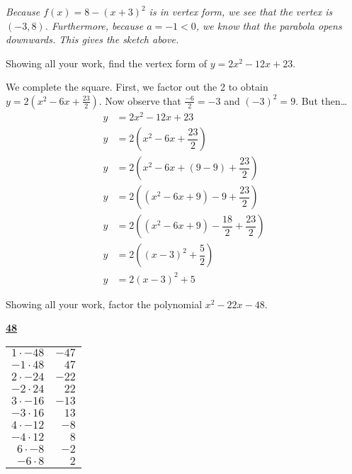 \documentclass[12pt,letterpaper]{exam}
\begin{document}
\begin{questions}
{\itshape Because $f(x)= 8 - (x + 3)^2$ is in vertex form, we see that the vertex is $(-3, 8)$. Furthermore, because $a= -1 < 0$, we know that the parabola opens downwards. This gives the sketch above.}



\newpage



\newpage
\question[6] Showing all your work, find the vertex form of $y= 2x^2 - 12x + 23$. \pspace

{\itshape 

We complete the square. First, we factor out the 2 to obtain $y= 2(x^2 - 6x + \frac{23}{2})$. Now observe that $\frac{-6}{2}= -3$ and $(-3)^2= 9$. But then\dots \pspace
	\[
	\begin{aligned}
	y&= 2x^2 - 12x + 23 \\[0.3cm]
	y&= 2 \left( x^2 - 6x + \dfrac{23}{2} \right) \\[0.3cm]
	y&= 2 \left( x^2 - 6x + (9 - 9) + \dfrac{23}{2} \right) \\[0.3cm]
	y&= 2 \left( (x^2 - 6x + 9) - 9 + \dfrac{23}{2} \right) \\[0.3cm]
	y&= 2 \left( (x^2 - 6x + 9) - \dfrac{18}{2} + \dfrac{23}{2} \right) \\[0.3cm]
	y&= 2 \left( (x - 3)^2 + \dfrac{5}{2} \right) \\[0.3cm]
	y&= 2(x - 3)^2 + 5
	\end{aligned}
	\]
}



\newpage



\newpage
\question[6] Showing all your work, factor the polynomial $x^2 - 22x - 48$. \pspace

{\itshape
	\begin{table}[!ht]
	\centering
	\underline{\bfseries 48} \pvspace{0.2cm}
	\begin{tabular}{rr}
	$1 \cdot -48$ & $-47$ \\
	$-1 \cdot 48$ & $47$ \\ \hline
	\multicolumn{1}{|r}{$2 \cdot -24$} & \multicolumn{1}{r|}{$-22$} \\ \hline
	$-2 \cdot 24$ & $22$ \\
	$3 \cdot -16$ & $-13$ \\
	$-3 \cdot 16$ & $13$ \\
	$4 \cdot -12$ & $-8$ \\
	$-4 \cdot 12$ & $8$ \\
	$6 \cdot -8$ & $-2$ \\
	$-6 \cdot 8$ & $2$ \\
	\end{tabular}
	\end{table}

}
\end{questions}
\end{document}
